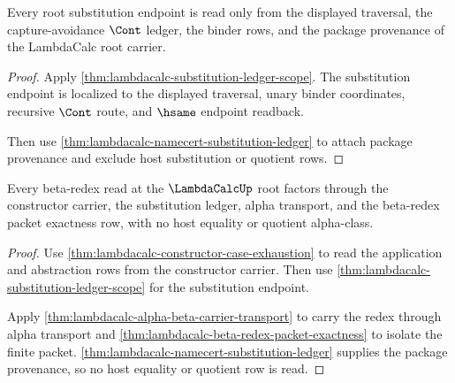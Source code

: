 \begin{theorem}
\label{thm:lambdacalc-root-substitution-scope}
Every root substitution endpoint is read only from the displayed traversal,
the capture-avoidance $\Cont$ ledger, the binder rows, and the package
provenance of the LambdaCalc root carrier.
\end{theorem}
\begin{proof}
Apply \autoref{thm:lambdacalc-substitution-ledger-scope}. The substitution
endpoint is localized to the displayed traversal, unary binder coordinates,
recursive $\Cont$ route, and $\hsame$ endpoint readback.

Then use \autoref{thm:lambdacalc-namecert-substitution-ledger} to attach
package provenance and exclude host substitution or quotient rows.
\end{proof}

\begin{theorem}
\label{thm:lambdacalc-root-beta-ledger-scope}
Every beta-redex read at the $\LambdaCalcUp$ root factors through the
constructor carrier, the substitution ledger, alpha transport, and the
beta-redex packet exactness row, with no host equality or quotient alpha-class.
\end{theorem}
\begin{proof}
Use \autoref{thm:lambdacalc-constructor-case-exhaustion} to read the
application and abstraction rows from the constructor carrier. Then use
\autoref{thm:lambdacalc-substitution-ledger-scope} for the substitution endpoint.

Apply \autoref{thm:lambdacalc-alpha-beta-carrier-transport} to carry the redex
through alpha transport and
\autoref{thm:lambdacalc-beta-redex-packet-exactness} to isolate the finite
packet. \autoref{thm:lambdacalc-namecert-substitution-ledger} supplies the
package provenance, so no host equality or quotient row is read.
\end{proof}




